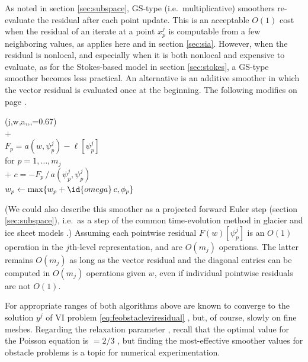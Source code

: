 \documentclass[letterpaper,final,12pt,reqno]{amsart}
\theoremstyle{claim}
\numberwithin{equation}{section}
\numberwithin{figure}{section}
\numberwithin{table}{section}
\numberwithin{theorem}{section}
\begin{document}
As noted in section \ref{sec:subspace}, GS-type (i.e.~multiplicative) smoothers re-evaluate the residual after each point update.  This is an acceptable $O(1)$ cost when the residual of an iterate at a point $x_p^j$ is computable from a few neighboring values, as applies here and in section \ref{sec:sia}.  However, when the residual is nonlocal, and especially when it is both nonlocal and expensive to evaluate, as for the Stokes-based model in section \ref{sec:stokes}, a GS-type smoother becomes less practical.  An alternative is an additive smoother in which the vector residual is evaluated once at the beginning.  The following modifies  on page \pageref{ps:jacobi-sweep}.
\begin{pseudo*} \label{ps:pjacobi}
(j,w,a,\ell,\phi,=0.67)\text{:} \\+
     \\
    $F_p = a(w,\psi_p^j) - \ell[\psi_p^j]$ \\
    for $p=1,\dots,m_j$ \\+
        $c = -F_p \,\big/\, a(\psi_p^j,\psi_p^j)$ \\
        $w_p \gets \max\{w_p + \id{omega}\,c, \phi_p\}$
\end{pseudo*}
(We could also describe this smoother as a projected forward Euler step (section \ref{sec:subspace}), i.e.~as a step of the common time-evolution method in glacier and ice sheet models \cite[for example]{Winkelmannetal2011}.)  Assuming each pointwise residual $F(w)[\psi_p^j]$ is an $O(1)$ operation in the $j$th-level representation,  and  are $O(m_j)$ operations.  The latter remains $O(m_j)$ as long as the vector residual and the diagonal entries can be computed in $O(m_j)$ operations given $w$, even if individual pointwise residuals are not $O(1)$.

For appropriate ranges of  both algorithms above are known to converge to the solution $y^j$ of VI problem \eqref{eq:feobstacleviresidual} \cite[Proposition 4.5]{GraeserKornhuber2009}, but, of course, slowly on fine meshes.  Regarding the relaxation parameter , recall that the optimal value for the Poisson equation is  $=2/3$ \cite{Briggsetal2000}, but finding the most-effective smoother values for obstacle problems is a topic for numerical experimentation.
\end{document}
